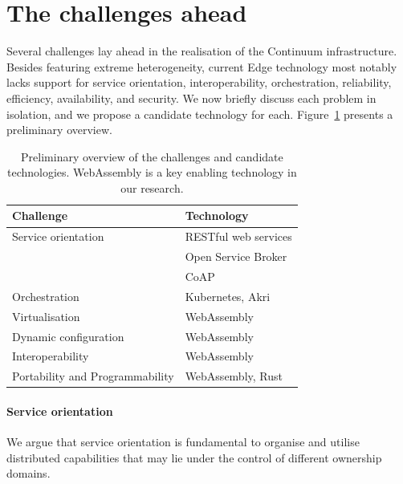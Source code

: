 \section{The challenges ahead}
\label{sec:challenges}

Several challenges lay ahead in the realisation of the Continuum infrastructure. Besides featuring extreme heterogeneity, current Edge technology most notably lacks support for service orientation, interoperability, orchestration, reliability, efficiency, availability, and security. We now briefly discuss each problem in isolation, and we propose a candidate technology for each. Figure~\ref{fig:challenges-technologies} presents a preliminary overview.

\begin{table}
  \caption{Preliminary overview of the challenges and candidate technologies. WebAssembly is a key enabling technology in our research.}  \label{fig:challenges-technologies}
  \begin{tabular*}{\textwidth}{ | l | l }
   \toprule
    \textbf{Challenge} & \textbf{Technology} \\
   \midrule
    Service orientation & RESTful web services \\
    & Open Service Broker \\
    & CoAP \\
    \midrule
    Orchestration & Kubernetes, Akri \\
    Virtualisation & WebAssembly \\
    Dynamic configuration & WebAssembly \\
    Interoperability & WebAssembly \\
    Portability and Programmability & WebAssembly, Rust \\
   \bottomrule
  \end{tabular*}
\end{table}

\paragraph{Service orientation}\label{p:service-orientation}
We argue that service orientation is fundamental to organise and utilise distributed capabilities that may lie under the control of different ownership domains. 

